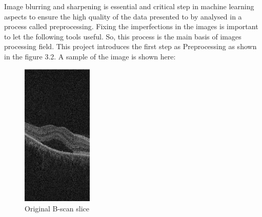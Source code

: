 Image blurring and sharpening is essential and critical step in machine learning aspects to ensure the high quality of the data presented to by analysed in a process called preprocessing.
Fixing the imperfections in the images is important to let the following tools useful.
So, this process is the main basis of images processing field. 
This project introduces the first step as Preprocessing as shown in the figure 3.2.
A sample of the image is shown here:
\begin{figure}[htb]
        \centering
        \includegraphics[width = 0.3\textwidth, height = 0.2\textheight]{figures/Original-image.jpg} %
  \caption{Original B-scan slice}
  \label{fig:Original image}
\end{figure}

